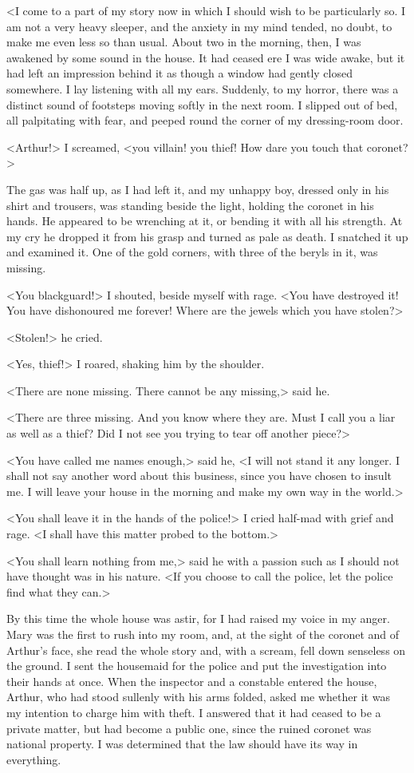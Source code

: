 <I come to a part of my story now in which I should wish to be particularly so. I am not a very heavy sleeper, and the anxiety in my mind tended, no doubt, to make me even less so than usual. About two in the morning, then, I was awakened by some sound in the house. It had ceased ere I was wide awake, but it had left an impression behind it as though a window had gently closed somewhere. I lay listening with all my ears. Suddenly, to my horror, there was a distinct sound of footsteps moving softly in the next room. I slipped out of bed, all palpitating with fear, and peeped round the corner of my dressing-room door.

<Arthur!> I screamed, <you villain! you thief! How dare you touch that coronet?>

The gas was half up, as I had left it, and my unhappy boy, dressed only in his shirt and trousers, was standing beside the light, holding the coronet in his hands. He appeared to be wrenching at it, or bending it with all his strength. At my cry he dropped it from his grasp and turned as pale as death. I snatched it up and examined it. One of the gold corners, with three of the beryls in it, was missing.

<You blackguard!> I shouted, beside myself with rage. <You have destroyed it! You have dishonoured me forever! Where are the jewels which you have stolen?>

<Stolen!> he cried.

<Yes, thief!> I roared, shaking him by the shoulder.

<There are none missing. There cannot be any missing,> said he.

<There are three missing. And you know where they are. Must I call you a liar as well as a thief? Did I not see you trying to tear off another piece?>

<You have called me names enough,> said he, <I will not stand it any longer. I shall not say another word about this business, since you have chosen to insult me. I will leave your house in the morning and make my own way in the world.>

<You shall leave it in the hands of the police!> I cried half-mad with grief and rage. <I shall have this matter probed to the bottom.>

<You shall learn nothing from me,> said he with a passion such as I should not have thought was in his nature. <If you choose to call the police, let the police find what they can.>

By this time the whole house was astir, for I had raised my voice in my anger. Mary was the first to rush into my room, and, at the sight of the coronet and of Arthur's face, she read the whole story and, with a scream, fell down senseless on the ground. I sent the housemaid for the police and put the investigation into their hands at once. When the inspector and a constable entered the house, Arthur, who had stood sullenly with his arms folded, asked me whether it was my intention to charge him with theft. I answered that it had ceased to be a private matter, but had become a public one, since the ruined coronet was national property. I was determined that the law should have its way in everything.

